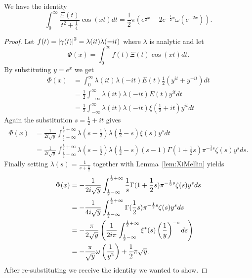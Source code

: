 \begin{proposition}
	We have the identity
\begin{equation*}	
	\int _0 ^{\infty} \frac{\Xi(t)}{t^2 + \frac{1}{4}} \cos(xt) dt = \frac{1}{2} \pi (e^{\frac{1}{2} x} - 2e^{-\frac{1}{2}x} \omega(e^{-2x})).
\end{equation*}
\end{proposition}
\begin{proof}
	Let $f(t) = \left|\gamma(t)\right|^2 = \lambda(it) \lambda(-it)$ where $\lambda$ is analytic and let
\begin{equation*}
	\Phi(x) = \int _0 ^{\infty} f(t) \Xi(t) \cos(xt) dt.	
\end{equation*}
	By substituting $y = e^x$ we get
\begin{equation*}
\begin{aligned}
	\Phi(x) 
		&= \int _0 ^\infty \lambda(it) \lambda(-it) E(t) \frac{1}{2}(y^{it} + y^{-it}) dt \\
		&= \frac{1}{2} \int _{-\infty} ^\infty \lambda(it) \lambda(-it) E(t) y^{it} dt \\
		&= \frac{1}{2} \int _{-\infty} ^\infty \lambda(it) \lambda(-it) \xi(\frac{1}{2} + it) y^{it} dt
\end{aligned}
\end{equation*}
	Again the substitution $s = \frac{1}{2} + it$ gives
\begin{equation*}
\begin{aligned}
	\Phi(x) 
		&= \frac{1}{2 i\sqrt{y}} \int _{\frac{1}{2} -\infty} ^{\frac{1}{2} + \infty} \lambda(s - \frac{1}{2}) \lambda(\frac{1}{2} - s) \xi(s) y^{s} dt \\
		&= \frac{1}{2 i\sqrt{y}} \int _{\frac{1}{2} -\infty} ^{\frac{1}{2} + \infty} \lambda(s - \frac{1}{2}) \lambda(\frac{1}{2} - s) (s - 1) \Gamma(1 + \frac{1}{2}s) \pi ^{-\frac{1}{2} s} \zeta(s) y^{s} ds.
\end{aligned}
\end{equation*}
	Finally setting $\lambda(s) = \frac{1}{s + \frac{1}{2}}$ together with Lemma~\ref{lem:XiMellin} yields 
\begin{equation*}
\begin{aligned}
	\Phi(x) 
		&= -\frac{1}{2 i\sqrt{y}} \int _{\frac{1}{2} -\infty} ^{\frac{1}{2} + \infty} \frac{1}{s} \Gamma(1 + \frac{1}{2} s) \pi ^{-\frac{1}{2} s} \zeta(s) y^{s} ds \\
		&= -\frac{1}{4 i\sqrt{y}} \int _{\frac{1}{2} -\infty} ^{\frac{1}{2} + \infty} \Gamma(\frac{1}{2} s) \pi ^{-\frac{1}{2} s} \zeta(s) y^{s} ds \\
		&= -\frac{\pi}{2 \sqrt{y}} \left(\frac{1}{2 i \pi} \int _{\frac{1}{2} -\infty} ^{\frac{1}{2} + \infty} \xi^*(s) \left(\frac{1}{y}\right)^{-s} ds\right) \\
		&= -\frac{\pi}{\sqrt{y}} \omega\left(\frac{1}{y^2}\right) + \frac{1}{2} \pi \sqrt{y}.
\end{aligned}
\end{equation*}
	After re-substituting we receive the identity we wanted to show.
\end{proof}


